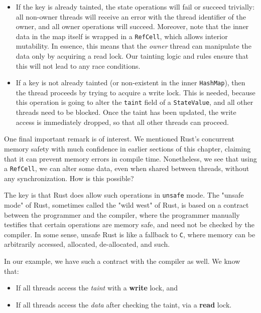 \begin{itemize}
    \item If the key is already tainted, the state operations will fail or succeed trivially: all
    non-owner threads will receive an error with the thread identifier of the owner, and all owner
    operations will succeed. Moreover, note that the inner data in the map itself is wrapped in a
    \texttt{RefCell}, which allows interior mutability\cite{RefCellInteriorMutability}. In essence,
    this means that the \textit{owner} thread can manipulate the data only by acquiring a read lock. Our tainting logic and rules ensure that this will not lead to any race conditions.

    \item If a key is not already tainted (or non-existent in the inner \texttt{HashMap}), then the
    thread proceeds by trying to acquire a write lock. This is needed, because this operation is going to alter the \texttt{taint} field of a \texttt{StateValue}, and all other threads need to be blocked. Once the taint has been updated, the write access is immediately dropped, so that all other threads can proceed.
\end{itemize}

One final important remark is of interest. We mentioned Rust's concurrent memory safety with much
confidence in earlier sections of this chapter, claiming that it can prevent memory errors in
compile time. Nonetheless, we see that using a \texttt{RefCell}, we can alter some data, even when
shared between threads, without any synchronization. How is this possible?

The key is that Rust does allow such operations in \texttt{unsafe} mode. The "unsafe mode" of Rust,
sometimes called the "wild west" of Rust, is based on a contract between the programmer and the
compiler, where the programmer manually testifies that certain operations are memory safe, and need
not be checked by the compiler. In some sense, unsafe Rust is like a fallback to \texttt{C}, where
memory can be arbitrarily accessed, allocated, de-allocated, and such.

In our example, we have such a contract with the compiler as well. We know that:

\begin{itemize}
    \item If all threads access the \textit{taint} with a \textbf{write} lock, and
    \item If all threads access the \textit{data} after checking the taint, via a \textbf{read} lock.
\end{itemize}

